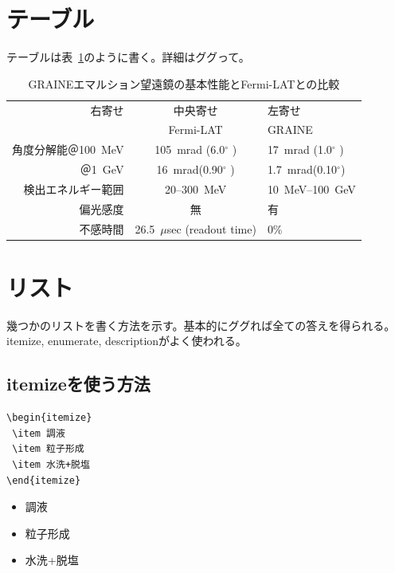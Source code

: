 \documentclass[a4j]{jsarticle}
\begin{document}
\clearpage

\section{テーブル}
テーブルは表~\ref{tab:emulsion_telescope}のように書く。詳細はググって。
\begin{table}[htbp]
\centering
	\begin{tabular}{r|c|l}
		右寄せ&中央寄せ&	左寄せ			\\
			&Fermi-LAT&	GRAINE			\\
		\hline
		\hline
		角度分解能＠100~MeV	&105~mrad (6.0$^\circ$ ) &17~mrad (1.0$^\circ$ ) \\
		＠1~GeV&16~mrad(0.90$^\circ$ )& 1.7~mrad(0.10$^\circ$) \\
		検出エネルギー範囲		&20--300~MeV		&10~MeV--100~GeV \\
		偏光感度		&無		&有 \\
		不感時間		&26.5~$\mu$sec (readout time) & 0\% \\
		\hline
	\end{tabular}
\caption{GRAINEエマルション望遠鏡の基本性能とFermi-LATとの比較\label{tab:emulsion_telescope}}
\end{table}
\newpage
\section{リスト}
幾つかのリストを書く方法を示す。基本的にググれば全ての答えを得られる。itemize, enumerate, descriptionがよく使われる。
\subsection{itemizeを使う方法}
\begin{verbatim}
\begin{itemize}
 \item 調液
 \item 粒子形成
 \item 水洗+脱塩
\end{itemize}
\end{verbatim}

\begin{itemize}
 \item 調液
 \item 粒子形成
 \item 水洗+脱塩
\end{itemize}
\end{document}
